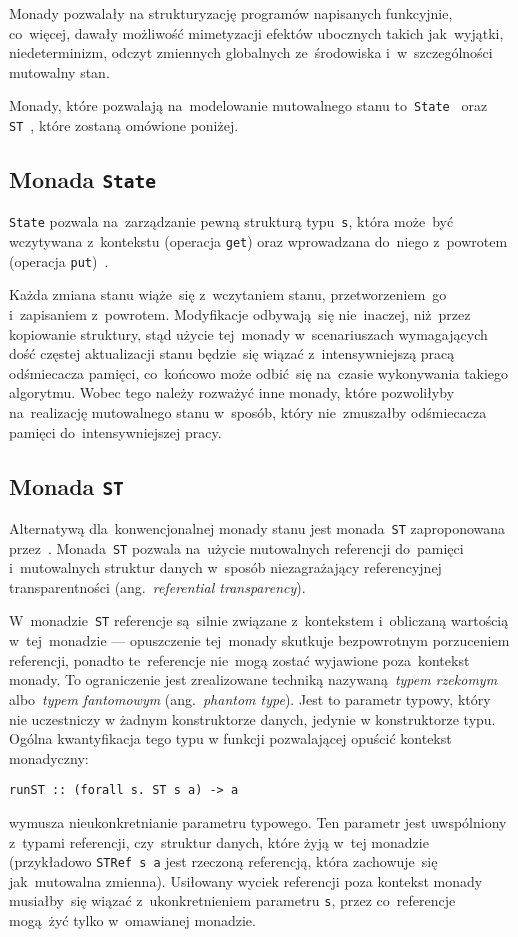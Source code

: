 \documentclass[../../thesis.tex]{subfiles}
\begin{document}
Monady pozwalały na strukturyzację programów napisanych funkcyjnie, co~więcej,
dawały możliwość mimetyzacji efektów ubocznych takich jak~wyjątki,
niedeterminizm, odczyt zmiennych globalnych ze~środowiska i~w~szczególności
mutowalny stan.

Monady, które pozwalają na~modelowanie mutowalnego stanu to~\texttt{State}~\cite{OSullivan:RWH}
oraz \texttt{ST}~\cite{Launchbury:LFST}, które zostaną omówione poniżej.

\subsection{Monada \texttt{State}}

\texttt{State} pozwala na~zarządzanie pewną strukturą typu~\texttt{s}, która
może~być wczytywana z~kontekstu (operacja \texttt{get}) oraz wprowadzana do~niego z~powrotem
(operacja \texttt{put})~\cite{OSullivan:RWH}.

Każda zmiana stanu wiąże~się z~wczytaniem stanu, przetworzeniem~go i~zapisaniem z~powrotem.
Modyfikacje odbywają~się nie~inaczej, niż~przez kopiowanie struktury, stąd użycie tej~monady
w~scenariuszach wymagających dość częstej aktualizacji stanu będzie~się wiązać z~intensywniejszą
pracą odśmiecacza pamięci, co~końcowo może odbić~się na~czasie wykonywania takiego algorytmu.
Wobec tego należy rozważyć inne monady, które pozwoliłyby na~realizację mutowalnego stanu
w~sposób, który nie~zmuszałby odśmiecacza pamięci do~intensywniejszej pracy.

\subsection{Monada \texttt{ST}}

Alternatywą dla~konwencjonalnej monady stanu jest monada~\texttt{ST} zaproponowana
przez~\cite{Launchbury:LFST}. Monada~\texttt{ST} pozwala na~użycie mutowalnych
referencji do~pamięci i~mutowalnych struktur danych w~sposób niezagrażający
referencyjnej transparentności (ang.~\emph{referential transparency}).

W~monadzie~\texttt{ST} referencje są~silnie związane z~kontekstem i~obliczaną wartością
w~tej~monadzie --- opuszczenie tej~monady skutkuje bezpowrotnym porzuceniem referencji,
ponadto te~referencje nie~mogą zostać wyjawione poza~kontekst monady. To ograniczenie
jest zrealizowane techniką nazywaną~\emph{typem rzekomym} albo~\emph{typem fantomowym}
(ang.~\emph{phantom type}). Jest to parametr typowy, który nie uczestniczy w żadnym 
konstruktorze danych, jedynie w konstruktorze typu. Ogólna kwantyfikacja tego typu
w funkcji pozwalającej opuścić kontekst monadyczny:
\begin{verbatim}
runST :: (forall s. ST s a) -> a
\end{verbatim}
wymusza nieukonkretnianie parametru typowego. Ten parametr jest uwspólniony z~typami
referencji, czy~struktur danych, które żyją w~tej monadzie (przykładowo \texttt{STRef s a}
jest rzeczoną referencją, która zachowuje~się jak~mutowalna zmienna).
Usiłowany wyciek referencji poza kontekst monady musiałby~się wiązać z~ukonkretnieniem parametru
\texttt{s}, przez co~referencje mogą~żyć tylko w~omawianej monadzie.
\end{document}
